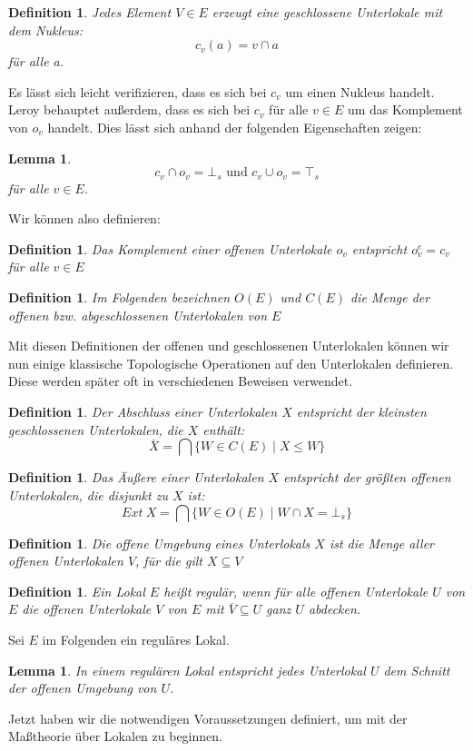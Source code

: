 \documentclass{article}
\newtheorem{lemma}[satz]{Lemma}
\newtheorem{definition}[satz]{Definition}
\begin{document}
\begin{definition}
    Jedes Element $V \in E$ erzeugt eine geschlossene Unterlokale mit dem Nukleus: 
    $$c_v(a) = v \cap a$$
    für alle a.
\end{definition}
Es lässt sich leicht verifizieren, dass es sich bei $c_v$ um einen Nukleus handelt. Leroy behauptet außerdem, dass es sich bei $c_v$ für alle $v \in E$ um das Komplement von $o_v$ handelt. Dies lässt sich anhand der folgenden Eigenschaften zeigen:
\begin{lemma}
    $$c_v \cap o_v = \bot_s \text{  und  } c_v \cup o_v = \top_s$$
    für alle $v \in E$. 
\end{lemma}
Wir können also definieren:
\begin{definition}
    Das Komplement einer offenen Unterlokale $o_v$ entspricht $o_v^c = c_v$ für alle $v \in E$
\end{definition}
\begin{definition}
    Im Folgenden bezeichnen $O(E)$ und $C(E)$ die Menge der offenen bzw. abgeschlossenen Unterlokalen von $E$
\end{definition}
Mit diesen Definitionen der offenen und geschlossenen Unterlokalen können wir nun einige klassische Topologische Operationen auf den Unterlokalen definieren. Diese werden später oft in verschiedenen Beweisen verwendet.
\begin{definition}
    Der Abschluss einer Unterlokalen $X$ entspricht der kleinsten geschlossenen Unterlokalen, die $X$ enthält:
        $$\overline{X} = \bigcap \{W \in C(E) \mid X \le W \}$$
\end{definition}
\begin{definition}
    Das Äußere einer Unterlokalen $X$ entspricht der größten offenen Unterlokalen, die disjunkt zu $X$ ist: $$Ext~X = \bigcap \{W \in O(E) \mid W \cap X = \bot_s \}$$
\end{definition}

\begin{definition}
    Die offene Umgebung eines Unterlokals $X$ ist die Menge aller offenen Unterlokalen $V$, für die gilt $X \subseteq V$
\end{definition}

\begin{definition}
    Ein Lokal $E$ heißt regulär, wenn für alle offenen Unterlokale $U$ von $E$ die offenen Unterlokale $V$ von $E$ mit $\overline{V} \subseteq U$ ganz $U$ abdecken.
\end{definition}
Sei $E$ im Folgenden ein reguläres Lokal.
\begin{lemma}
\label{lem:regular_sublocal}
    In einem regulären Lokal entspricht jedes Unterlokal $U$ dem Schnitt der offenen Umgebung von $U$.
\end{lemma}
Jetzt haben wir die notwendigen Voraussetzungen definiert, um mit der Maßtheorie über Lokalen zu beginnen.
\end{document}

